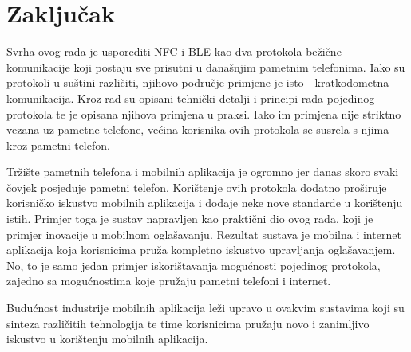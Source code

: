 \chapter{Zaklju\v{c}ak}

Svrha ovog rada je usporediti NFC i BLE kao dva protokola be\v{z}i\v{c}ne komunikacije koji postaju sve prisutni u dana\v{s}njim pametnim telefonima. Iako su protokoli u su\v{s}tini razli\v{c}iti, njihovo podru\v{c}je primjene je isto - kratkodometna komunikacija. Kroz rad su opisani tehni\v{c}ki detalji i principi rada pojedinog protokola te je opisana njihova primjena u praksi.
Iako im primjena nije striktno vezana uz pametne telefone, ve\'{c}ina korisnika ovih protokola se susrela s njima kroz pametni telefon. 

Tr\v{z}i\v{s}te pametnih telefona i mobilnih aplikacija je ogromno jer danas skoro svaki \v{c}ovjek posjeduje pametni telefon. Kori\v{s}tenje ovih protokola dodatno pro\v{s}iruje korisni\v{c}ko iskustvo mobilnih aplikacija i dodaje neke nove standarde u kori\v{s}tenju istih. Primjer toga je sustav napravljen kao prakti\v{c}ni dio ovog rada, koji je primjer inovacije u mobilnom ogla\v{s}avanju. Rezultat sustava je mobilna i internet aplikacija koja korisnicima pru\v{z}a kompletno iskustvo upravljanja ogla\v{s}avanjem. No, to je samo jedan primjer iskori\v{s}tavanja mogu\'{c}nosti pojedinog protokola, zajedno sa mogu\'{c}nostima koje pru\v{z}aju pametni telefoni i internet.

Budu\'{c}nost industrije mobilnih aplikacija le\v{z}i upravo u ovakvim sustavima koji su sinteza razli\v{c}itih tehnologija te time korisnicima pru\v{z}aju novo i zanimljivo iskustvo u kori\v{s}tenju mobilnih aplikacija.
